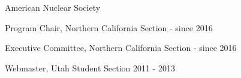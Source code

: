 \begin{list1}
\item[] American Nuclear Society  
\begin{list2}
\item Program Chair, Northern California Section \hfill{ - since 2016}
\item Executive Committee, Northern California Section \hfill{ - since 2016}
\item Webmaster, Utah Student Section \hfill{2011 -  2013}
\end{list2}
\end{list1}
